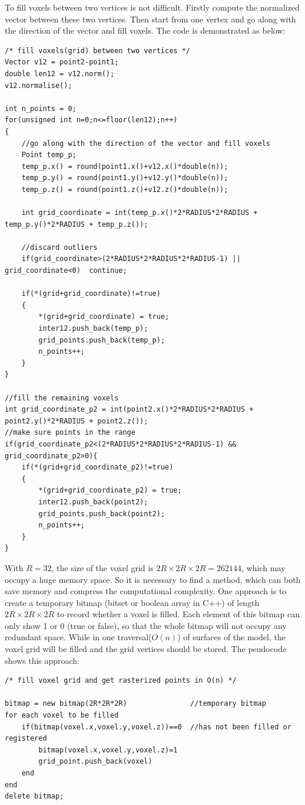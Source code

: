 To fill voxels between two vertices is not difficult. Firstly compute the normalized vector between these two vertices. Then start from one vertex and go along with the direction of the vector and fill voxels. The code is demonstrated as below:

\begin{lstlisting}[xleftmargin=1em]
/* fill voxels(grid) between two vertices */
Vector v12 = point2-point1;
double len12 = v12.norm();
v12.normalise();

int n_points = 0;
for(unsigned int n=0;n<=floor(len12);n++)
{
    //go along with the direction of the vector and fill voxels
	Point temp_p;
	temp_p.x() = round(point1.x()+v12.x()*double(n));
	temp_p.y() = round(point1.y()+v12.y()*double(n));
	temp_p.z() = round(point1.z()+v12.z()*double(n));

	int grid_coordinate	= int(temp_p.x()*2*RADIUS*2*RADIUS + temp_p.y()*2*RADIUS + temp_p.z());

	//discard outliers
	if(grid_coordinate>(2*RADIUS*2*RADIUS*2*RADIUS-1) || grid_coordinate<0)  continue; 

	if(*(grid+grid_coordinate)!=true)
	{
		*(grid+grid_coordinate) = true;
		inter12.push_back(temp_p);
		grid_points.push_back(temp_p);
		n_points++;
	}
}

//fill the remaining voxels
int grid_coordinate_p2 = int(point2.x()*2*RADIUS*2*RADIUS + point2.y()*2*RADIUS + point2.z());
//make sure points in the range
if(grid_coordinate_p2<(2*RADIUS*2*RADIUS*2*RADIUS-1) && grid_coordinate_p2>0){
	if(*(grid+grid_coordinate_p2)!=true)
	{
		*(grid+grid_coordinate_p2) = true;
		inter12.push_back(point2);
		grid_points.push_back(point2);
		n_points++;
	} 
}
\end{lstlisting}

With $R = 32$, the size of the voxel grid is $2R\times2R\times2R = 262144$, which may occupy a huge memory space. So it is necessary to find a method, which can both save memory and compress the computational complexity. One approach is to create a temporary bitmap (bitset or boolean array in C++) of length $2R\times2R\times2R$ to record whether a voxel is filled. Each element of this bitmap can only show 1 or 0 (true or false), so that the whole bitmap will not occupy any redundant space. While in one traversal($O(n)$) of surfaces of the model, the voxel grid will be filled and the grid vertices should be stored. The peudocode shows this approach: 

\begin{lstlisting}[xleftmargin=1em]
/* fill voxel grid and get rasterized points in O(n) */

bitmap = new bitmap(2R*2R*2R)               //temporary bitmap
for each voxel to be filled
    if(bitmap(voxel.x,voxel.y,voxel.z))==0  //has not been filled or registered
        bitmap(voxel.x,voxel.y,voxel.z)=1
        grid_point.push_back(voxel)
    end
end
delete bitmap;
\end{lstlisting}

